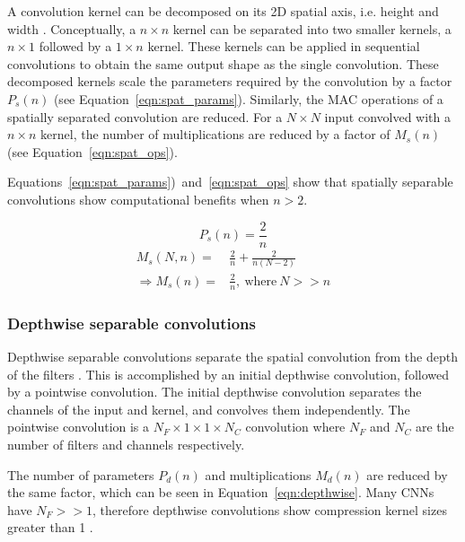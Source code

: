 \documentclass{article}
\begin{document}
	A convolution kernel can be decomposed on its 2D spatial axis, i.e. height and width \cite{inception,adscnet,effnet,squeezenet}. Conceptually, a $n \times n$ kernel can be separated into two smaller kernels, a $n \times 1$ followed by a $1 \times n$ kernel. These kernels can be applied in sequential convolutions to obtain the same output shape as the single convolution. These decomposed kernels scale the parameters required by the convolution by a factor $P_s(n)$ (see Equation~\ref{eqn:spat_params}). Similarly, the MAC operations of a spatially separated convolution are reduced. For a $N \times N$ input convolved with a $n \times n$ kernel, the number of multiplications are reduced by a factor of $M_s(n)$ (see Equation~\ref{eqn:spat_ops}). 
	
	Equations~\ref{eqn:spat_params})~and~\ref{eqn:spat_ops} show that spatially separable convolutions show computational benefits when $n > 2$. 
	
	\vspace{-1cm}
	
	\begin{multicols}{2}
		\begin{equation}\label{eqn:spat_params}
			P_s(n) = \frac{2}{n}
		\end{equation}
	\break
		\begin{equation}\label{eqn:spat_ops}
			\begin{split}
				M_s(N, n) = & \frac{2}{n} + \frac{2}{n(N-2)} \\
				\Rightarrow M_s(n) = & \frac{2}{n},~\text{where}~N >> n
			\end{split}
		\end{equation}		
	\end{multicols}
	
	\subsubsection{Depthwise separable convolutions}	
	
	Depthwise separable convolutions separate the spatial convolution from the depth of the filters \cite{mobilenet,xception}. This is accomplished by an initial depthwise convolution, followed by a pointwise convolution. The initial depthwise convolution separates the channels of the input and kernel, and convolves them independently. The pointwise convolution is a $N_F \times 1 \times 1 \times N_C$ convolution where $N_F$ and $N_C$ are the number of filters and channels respectively. 
	
	The number of parameters $P_d(n)$ and multiplications $M_d(n)$ are reduced by the same factor, which can be seen in Equation~\ref{eqn:depthwise}. Many CNNs have $N_F >> 1$, therefore depthwise convolutions show compression kernel sizes greater than 1  \cite{vgg, yolo, resnetv2}. 
\end{document}
